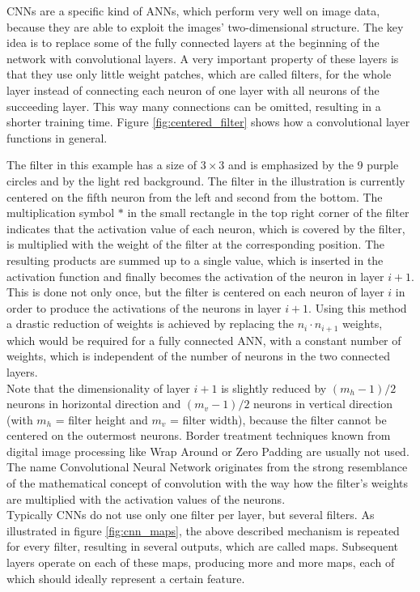 \documentclass[11pt, a4paper]{article}
\begin{document}
\acfp{CNN} are a specific kind of \acp{ANN}, which perform very well on image data, because they are able to exploit the images' two-dimensional structure. The key idea is to replace some of the fully connected layers at the beginning of the network with convolutional layers. A very important property of these layers is that they use only little weight patches, which are called filters, for the whole layer instead of connecting each neuron of one layer with all neurons of the succeeding layer. This way many connections can be omitted, resulting in a shorter training time. Figure \ref{fig:centered_filter} shows how a convolutional layer functions in general.

The filter in this example has a size of $3\times3$ and is emphasized by the 9 purple circles and by the light red background. The filter in the illustration is currently centered on the fifth neuron from the left and second from the bottom. The multiplication symbol $*$ in the small rectangle in the top right corner of the filter indicates that the activation value of each neuron, which is covered by the filter, is multiplied with the weight of the filter at the corresponding position. The resulting products are summed up to a single value, which is inserted in the activation function and finally becomes the activation of the neuron in layer $i+1$. This is done not only once, but the filter is centered on each neuron of layer $i$ in order to produce the activations of the neurons in layer $i+1$. Using this method a drastic reduction of weights is achieved by replacing the $n_i \cdot n_{i+1}$ weights, which would be required for a fully connected \ac{ANN}, with a constant number of weights, which is independent of the number of neurons in the two connected layers.\\
Note that the dimensionality of layer $i+1$ is slightly reduced by $(m_h - 1) / 2$ neurons in horizontal direction and $(m_v - 1)/2$ neurons in vertical direction (with $m_h$ = filter height and $m_v$ = filter width), because the filter cannot be centered on the outermost neurons. Border treatment techniques known from digital image processing like Wrap Around or Zero Padding are usually not used. The name Convolutional Neural Network originates from the strong resemblance of the mathematical concept of convolution with the way how the filter's weights are multiplied with the activation values of the neurons.\\
Typically \acp{CNN} do not use only one filter per layer, but several filters. As illustrated in figure \ref{fig:cnn_maps}, the above described mechanism is repeated for every filter, resulting in several outputs, which are called maps. Subsequent layers operate on each of these maps, producing more and more maps, each of which should ideally represent a certain feature.
\end{document}

